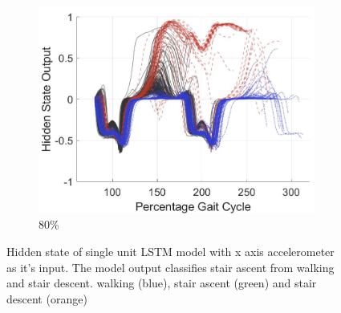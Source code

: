 \documentclass[sensors,article,submit,moreauthors,pdftex]{Definitions/mdpi}
\begin{document}
\begin{figure}[!hbt]
     \begin{subfigure}[b]{0.32\textwidth}
         \centering
         \includegraphics[width=\textwidth]{Figures/results/hidden_state/gyro_y_sa_v_w-sd/80_Participant_04.jpg}
         \caption{80\%}
         \label{subfig:gyro_y_w_v_sa_sd_80}
     \end{subfigure}
    \caption{Hidden state of single unit LSTM model with x axis accelerometer as it's input. The model output classifies stair ascent from walking and stair descent. walking (blue), stair ascent (green) and stair descent (orange)}
    \label{fig:hidden-state-gyro-y-w_v_sa-sd}
\end{figure}
\end{document}
